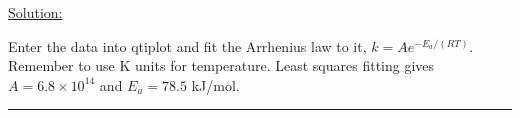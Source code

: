 \noindent
\underline{Solution:}

Enter the data into qtiplot and fit the Arrhenius law to it, $k = Ae^{-E_a/(RT)}$. Remember to use K units for temperature. Least squares fitting gives $A = 6.8\times 10^{14}$ and $E_a = 78.5$ kJ/mol.

\hrule\vspace{0.5cm}
